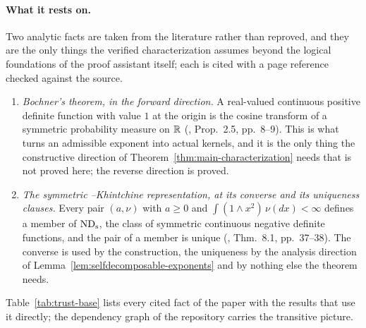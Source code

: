 \paragraph{What it rests on.} Two analytic facts are taken from the literature rather than
reproved, and they are the only things the verified characterization assumes beyond the
logical foundations of the proof assistant itself; each is cited with a page reference
checked against the source.
\begin{enumerate}
\item \emph{Bochner's theorem, in the forward direction.} A real-valued continuous positive
definite function with value $1$ at the origin is the cosine transform of a symmetric
probability measure on $\mathbb{R}$ (, Prop.~2.5, pp.~8--9). This is what turns an
admissible exponent into actual kernels, and it is the only thing the constructive
direction of Theorem~\ref{thm:main-characterization} needs that is not proved here; the
reverse direction is proved.
\item \emph{The symmetric \Levy--Khintchine representation, at its converse and its
uniqueness clauses.} Every pair $(a,\nu)$ with $a \ge 0$ and
$\int (1 \wedge x^2)\,\nu(dx) < \infty$ defines a member of $\mathrm{ND}_{\mathrm{s}}$, the class of symmetric continuous negative definite functions,
and the pair of a member
is unique (, Thm.~8.1, pp.~37--38). The converse is used by the
construction, the uniqueness by the analysis direction of
Lemma~\ref{lem:selfdecomposable-exponents} and by nothing else the theorem needs.
\end{enumerate}
Table~\ref{tab:trust-base} lists every cited fact of the paper with the results that use it
directly; the dependency graph of the repository carries the transitive picture.

